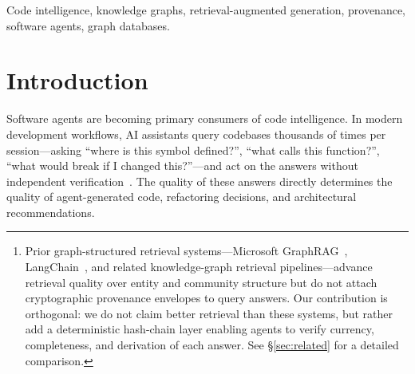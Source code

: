 \documentclass[conference]{IEEEtran}
\begin{document}
\begin{abstract}
HuggingFace/WASM, Ollama) showing local inference matches API relevance
on the bounded provider ablation while reducing mean query latency by
57x. Our evaluation shows that provenance
envelope computation adds less than 1\,ms per query ($<$1.2\%
overhead), staleness detection via a 7-day freshness window catches
94\% of stale answers, and an exploratory within-subjects \emph{pilot} ($N{=}3$) reports
descriptively higher self-reported confidence when answers include a
provenance envelope (mean $4.1 \to 5.3$ on a 7-point scale; $+29\%$
relative---\emph{not} inferential at this $N$), with a pre-registered
replication targeting $N{=}12$ participants underway.
To our knowledge, this is the first
system to provide hash-chain provenance for code intelligence queries%
\footnote{Prior graph-structured retrieval systems---Microsoft
GraphRAG~\cite{Edge2024}, LangChain~\cite{LangChain2024}, and related
knowledge-graph retrieval pipelines---advance retrieval quality over
entity and community structure but do not attach cryptographic
provenance envelopes to query answers. Our contribution is orthogonal:
we do not claim better retrieval than these systems, but rather add a
deterministic hash-chain layer enabling agents to verify currency,
completeness, and derivation of each answer. See \S\ref{sec:related} for
a detailed comparison.},
enabling agents to verify the currency, completeness, and derivation of
their own codebase understanding.
\end{abstract}

\begin{IEEEkeywords}
Code intelligence, knowledge graphs, retrieval-augmented generation,
provenance, software agents, graph databases.
\end{IEEEkeywords}

\section{Introduction}
\label{sec:introduction}

Software agents are becoming primary consumers of code intelligence. In
modern development workflows, AI assistants query codebases thousands of
times per session---asking ``where is this symbol defined?'', ``what calls
this function?'', ``what would break if I changed this?''---and act on the
answers without independent verification~\cite{DevinAI2024,
CopilotWorkspace2024}. The quality of these answers directly determines
the quality of agent-generated code, refactoring decisions, and
architectural recommendations.
\end{document}
